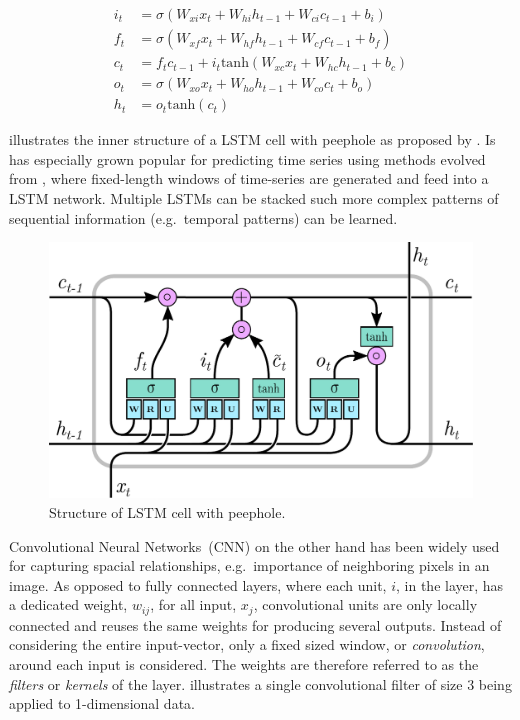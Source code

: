 \documentclass[preprint,12pt]{elsarticle}
\begin{document}
\begin{equation}
\begin{aligned}
  i_t &= \sigma \left( W_\mathit{xi} x_t + W_\mathit{hi} h_{t-1} + W_{ci} c_{t-1} + b_i \right) \\
  f_t &= \sigma \left( W_\mathit{xf} x_t + W_\mathit{hf} h_{t-1} + W_\mathit{cf} c_{t-1} + b_f \right) \\
  c_t &= f_t c_{t-1} + i_t \mathrm{tanh} \left( W_\mathit{xc} x_t + W_\mathit{hc} h_{t-1} + b_c \right) \\
  o_t &= \sigma \left( W_\mathit{xo} x_t + W_\mathit{ho} h_{t-1} + W_\mathit{co} c_{t} + b_o \right) \\
  h_t &= o_t \mathrm{tanh} \left( c_t \right)
\end{aligned}
\label{eq:lstm}
\end{equation}

 illustrates the inner structure of a LSTM cell with peephole as proposed by \cite{LstmPeephole}. 
Is has especially grown popular for predicting time series using methods evolved from \cite{LstmTs}, where fixed-length windows of time-series are generated and feed into a LSTM network. Multiple LSTMs can be stacked such more complex patterns of sequential information (e.g.\ temporal patterns) can be learned.

\begin{figure}[!ht]
  \centering
  \includegraphics[scale=.6]{drawings/lstm-peepholes.pdf}
  \caption{Structure of LSTM cell with peephole.}
  \label{fig:lstm-peepholes}
\end{figure}

Convolutional Neural Networks~(CNN) on the other hand has been widely used for capturing spacial relationships, e.g.\ importance of neighboring pixels in an image. As opposed to fully connected layers, where each unit, $i$, in the layer, has a dedicated weight, $w_{ij}$, for all input, $x_j$, convolutional units are only locally connected and reuses the same weights for producing several outputs. Instead of considering the entire input-vector, only a fixed sized window, or \emph{convolution}, around each input is considered. The weights are therefore referred to as the \emph{filters} or \emph{kernels} of the layer.  illustrates a single convolutional filter of size $3$ being applied to 1-dimensional data.
\end{document}
